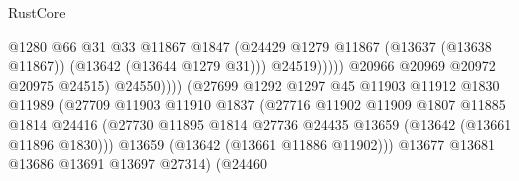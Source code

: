 \begin{lexlean}{RustCore}
\begin{coremodule}
                                                    @1280
                                                    @66
                                                    @31
                                                    @33
                                                    @11867
                                                    @1847
                                                    (@24429
                                                      @1279
                                                      @11867
                                                      (@13637 (@13638 @11867))
                                                      (@13642 (@13644 @1279 @31)))
                                                    @24519)))))
                                          @20966
                                          @20969
                                          @20972
                                          @20975
                                          @24515)
                                        @24550))))
                                (@27699
                                  @1292
                                  @1297
                                  @45
                                  @11903
                                  @11912
                                  @1830
                                  @11989
                                  (@27709
                                    @11903
                                    @11910
                                    @1837
                                    (@27716
                                      @11902
                                      @11909
                                      @1807
                                      @11885
                                      @1814
                                      @24416
                                      (@27730
                                        @11895
                                        @1814
                                        @27736
                                        @24435
                                        @13659
                                        (@13642 (@13661 @11896 @1830)))
                                      @13659
                                      (@13642 (@13661 @11886 @11902)))
                                    @13677
                                    @13681
                                    @13686
                                    @13691
                                    @13697
                                    @27314)
                                  (@24460

\end{coremodule}
\end{lexlean}
